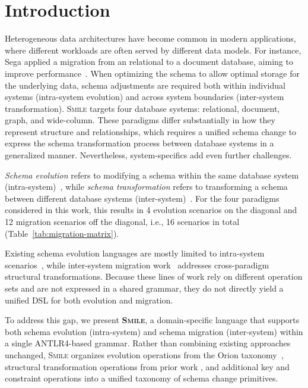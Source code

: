 \documentclass{llncs}
\begin{document}
\section{Introduction}
\label{sec:introduction}


Heterogeneous data architectures have become common in modern applications, where different workloads are often served by different data models.
For instance, Sega applied a migration from an relational to a document database, aiming to improve performance~\cite{bansal2021journey}. When optimizing the schema to allow optimal storage for the underlying data, schema adjustments are required both within individual systems (intra-system evolution) and across system boundaries (inter-system transformation). \textsc{Smile} targets four database systems: relational, document, graph, and wide-column. These paradigms differ substantially in how they represent structure and relationships, which requires a unified schema change to express the schema transformation process between database systems in a generalized manner. Nevertheless, system-specifics add even further challenges.


\emph{Schema evolution} refers to modifying a schema within the same database system (intra-system)~\cite{brahmia2024literature}, while
\emph{schema transformation} refers to transforming a schema between different database systems (inter-system)~\cite{googlecloud2024heterogeneous}.
For the four paradigms considered in this work, this results in 4 evolution scenarios on the diagonal and 12 migration scenarios off the diagonal, i.e., 16 scenarios in total (Table~\ref{tab:migration-matrix}).


Existing schema evolution languages are mostly limited to intra-system scenarios~\cite{storl2022darwin,chillon2022taxonomy,curino2008graceful,herrmann2015codel,herrmann2017living,hausler2023language}, while inter-system migration work~\cite{meier2023datenmigration} addresses cross-paradigm structural transformations. Because these lines of work rely on different operation sets and are not expressed in a shared grammar, they do not directly yield a unified DSL for both evolution and migration.


To address this gap, we present \textbf{\textsc{Smile}}, a domain-specific language that supports both schema evolution (intra-system) and schema migration (inter-system) within a single ANTLR4-based grammar. Rather than combining existing approaches unchanged, \textsc{Smile} organizes evolution operations from the Orion taxonomy~\cite{chillon2022taxonomy}, structural transformation operations from prior work ,
and additional key and constraint operations into a unified taxonomy of schema change primitives.
\end{document}
